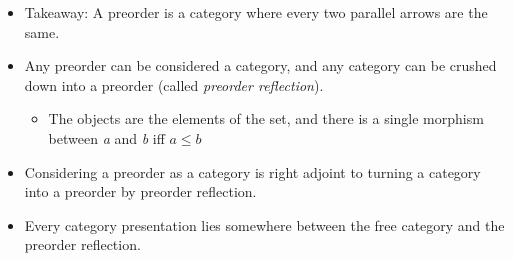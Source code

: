 \begin{itemize}
    \item Takeaway: A preorder is a category where every two parallel arrows are the same.
    \item Any preorder can be considered a category, and any category can be crushed down into a preorder (called \emph{preorder reflection}).
          \begin{itemize}
            \item The objects are the elements of the set, and there is a single morphism between \emph{a} and \emph{b} iff $a \leq b$
          \end{itemize}
    \item Considering a preorder as a category is right adjoint to turning a category into a preorder by preorder reflection.
    \item Every category presentation lies somewhere between the free category and the preorder reflection.
  \end{itemize}
